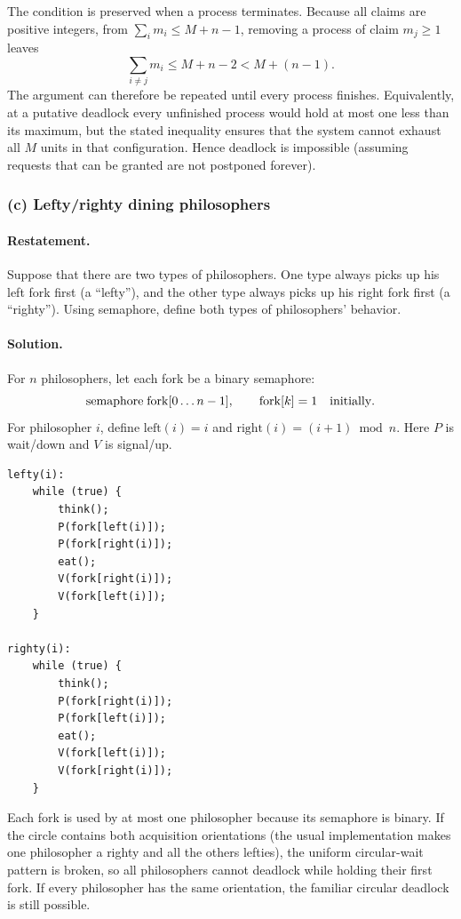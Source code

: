 The condition is preserved when a process terminates.  Because all
claims are positive integers, from
\(\sum_i m_i\leq M+n-1\), removing a process of claim \(m_j\geq1\)
leaves
\[
\sum_{i\ne j}m_i\leq M+n-2<M+(n-1).
\]
The argument can therefore be repeated until every process finishes.
Equivalently, at a putative deadlock every unfinished process would
hold at most one less than its maximum, but the stated inequality
ensures that the system cannot exhaust all \(M\) units in that
configuration.  Hence deadlock is impossible (assuming requests that
can be granted are not postponed forever).

\subsubsection*{(c) Lefty/righty dining philosophers}

\paragraph{Restatement.}
Suppose that there are two types of philosophers.  One type always
picks up his left fork first (a ``lefty''), and the other type always
picks up his right fork first (a ``righty'').  Using semaphore, define
both types of philosophers' behavior.

\paragraph{Solution.}
For \(n\) philosophers, let each fork be a binary semaphore:
\[
\mathrm{semaphore}\;\mathrm{fork}[0\ldots n-1],
\qquad \mathrm{fork}[k]=1\quad\hbox{initially}.
\]
For philosopher \(i\), define
\(\mathrm{left}(i)=i\) and
\(\mathrm{right}(i)=(i+1)\bmod n\).  Here \(P\) is wait/down and \(V\)
is signal/up.

\begin{verbatim}
lefty(i):
    while (true) {
        think();
        P(fork[left(i)]);
        P(fork[right(i)]);
        eat();
        V(fork[right(i)]);
        V(fork[left(i)]);
    }

righty(i):
    while (true) {
        think();
        P(fork[right(i)]);
        P(fork[left(i)]);
        eat();
        V(fork[left(i)]);
        V(fork[right(i)]);
    }
\end{verbatim}

Each fork is used by at most one philosopher because its semaphore is
binary.  If the circle contains both acquisition orientations (the
usual implementation makes one philosopher a righty and all the
others lefties), the uniform circular-wait pattern is broken, so all
philosophers cannot deadlock while holding their first fork.  If every
philosopher has the same orientation, the familiar circular deadlock
is still possible.

